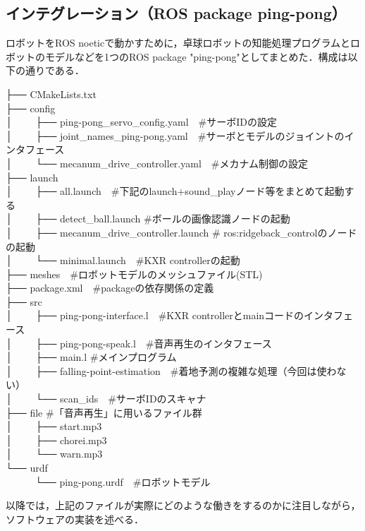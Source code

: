 \documentclass[10pt, oneside, titlepage]{ltjarticle}  %
\begin{document}
  \subsection{インテグレーション（ROS package ping-pong）}
  ロボットをROS noeticで動かすために，卓球ロボットの知能処理プログラムとロボットのモデルなどを1つのROS package "ping-pong"としてまとめた．構成は以下の通りである．
  \begin{screen}
  ├── CMakeLists.txt \\
  ├── config \\
  │　　 ├── ping-pong\_servo\_config.yaml　\#サーボIDの設定 \\
  │　　 ├── joint\_names\_ping-pong.yaml　\#サーボとモデルのジョイントのインタフェース \\
  │　　 └── mecanum\_drive\_controller.yaml　\#メカナム制御の設定 \\
  ├── launch \\
  │　　 ├── all.launch　\#下記のlaunch+sound\_playノード等をまとめて起動する \\
  │　　 ├── detect\_ball.launch \#ボールの画像認識ノードの起動 \\
  │　　 ├── mecanum\_drive\_controller.launch \# ros:ridgeback\_controlのノードの起動 \\
  │　　 └── minimal.launch　\#KXR controllerの起動 \\
  ├── meshes　\#ロボットモデルのメッシュファイル(STL) \\
  ├── package.xml　\#packageの依存関係の定義 \\
  ├── src \\
  │　　 ├── ping-pong-interface.l　\#KXR controllerとmainコードのインタフェース \\
  │　　 ├── ping-pong-speak.l　\#音声再生のインタフェース  \\
  │　　 ├── main.l \#メインプログラム  \\
  │　　 ├── falling-point-estimation　\#着地予測の複雑な処理（今回は使わない）  \\
  │　　 └── scan\_ids　\#サーボIDのスキャナ \\ 
  ├── file \#「音声再生」に用いるファイル群 \\
  │　　 ├── start.mp3 \\
  │　　 ├── chorei.mp3 \\
  │　　 └── warn.mp3 \\
  └── urdf \\
  　　　└── ping-pong.urdf　\#ロボットモデル
  \end{screen}
  以降では，上記のファイルが実際にどのような働きをするのかに注目しながら，ソフトウェアの実装を述べる．
\end{document}
